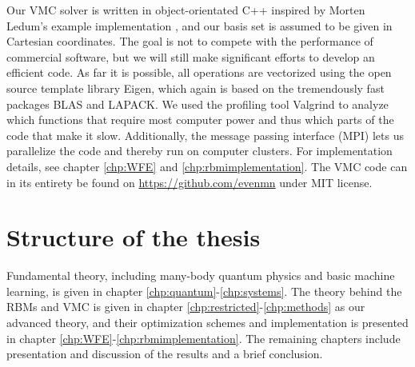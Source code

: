 Our VMC solver is written in object-orientated C++ inspired by Morten Ledum's example implementation \cite{ledum_simple_2016}, and our basis set is assumed to be given in Cartesian coordinates. The goal is not to compete with the performance of commercial software, but we will still make significant efforts to develop an efficient code. As far it is possible, all operations are vectorized using the open source template library Eigen, which again is based on the tremendously fast packages BLAS and LAPACK. We used the profiling tool Valgrind to analyze which functions that require most computer power and thus which parts of the code that make it slow. Additionally, the message passing interface (MPI) lets us parallelize the code and thereby run on computer clusters. For implementation details, see chapter \ref{chp:WFE} and \ref{chp:rbmimplementation}. The VMC code can in its entirety be found on \url{https://github.com/evenmn} under MIT license. 

\section{Structure of the thesis}
Fundamental theory, including many-body quantum physics and basic machine learning, is given in chapter \ref{chp:quantum}-\ref{chp:systems}. The theory behind the RBMs and VMC is given in chapter \ref{chp:restricted}-\ref{chp:methods} as our advanced theory, and their optimization schemes and implementation is presented in chapter \ref{chp:WFE}-\ref{chp:rbmimplementation}. The remaining chapters include presentation and discussion of the results and a brief conclusion.
